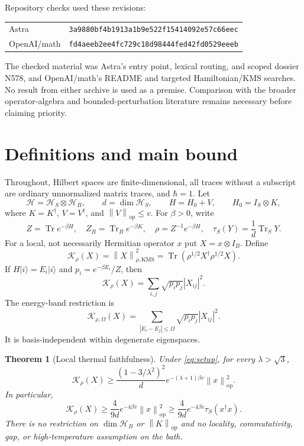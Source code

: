 \documentclass[11pt]{article}
\newtheorem{theorem}{Theorem}[section]
\theoremstyle{remark}\newtheorem{remark}[theorem]{Remark}
\newcommand{\Tr}{\operatorname{Tr}}
\newcommand{\op}{\mathrm{op}}
\newcommand{\KMS}{\mathrm{KMS}}
\newcommand{\norm}[1]{\left\lVert #1\right\rVert}
\newcommand{\abs}[1]{\left\lvert #1\right\rvert}
\newcommand{\tauS}{\tau_S}
\begin{document}
Repository checks used these revisions:\par
{\small\begin{tabular}{@{}ll@{}}
Astra & \texttt{3a9880bf4b1913a1b9e522f15414092e57c66eec}\\
OpenAI/math & \texttt{fd4aeeb2ee4fc729c18d98444fed42fd0529eeeb}
\end{tabular}}\par
The checked material was Astra's entry point, lexical routing, and scoped dossier N578, and OpenAI/math's README and targeted Hamiltonian/KMS searches. No result from either archive is used as a premise. Comparison with the broader operator-algebra and bounded-perturbation literature remains necessary before claiming priority.

\section{Definitions and main bound}
Throughout, Hilbert spaces are finite-dimensional, all traces without a subscript are ordinary unnormalized matrix traces, and $\hbar=1$. Let
\begin{equation}\label{eq:setup}
 \mathcal H=\mathcal H_S\otimes\mathcal H_B,\qquad
 d=\dim\mathcal H_S,\qquad H=H_0+V,\qquad H_0=I_S\otimes K,
\end{equation}
where $K=K^\dagger$, $V=V^\dagger$, and $\norm V_\op\leq v$. For $\beta>0$, write
\[
 Z=\Tr e^{-\beta H},\quad Z_B=\Tr_B e^{-\beta K},\quad
 \rho=Z^{-1}e^{-\beta H},\quad \tauS(Y)=\frac{1}{d}\Tr_S Y.
\]
For a local, not necessarily Hermitian operator $x$ put $X=x\otimes I_B$. Define
\begin{equation}
 \mathcal K_\rho(X)=\norm X_{\rho,\KMS}^2
 =\Tr(\rho^{1/2}X^\dagger\rho^{1/2}X).
\end{equation}
If $H|i\rangle=E_i|i\rangle$ and $p_i=e^{-\beta E_i}/Z$, then
\begin{equation}\label{eq:kms-spectral}
 \mathcal K_\rho(X)=\sum_{i,j}\sqrt{p_i p_j}\abs{X_{ij}}^2.
\end{equation}
The energy-band restriction is
\begin{equation}
 \mathcal K_{\rho,\Omega}(X)=
 \sum_{\abs{E_i-E_j}\leq\Omega}\sqrt{p_i p_j}\abs{X_{ij}}^2.
\end{equation}
It is basis-independent within degenerate eigenspaces.

\begin{theorem}[Local thermal faithfulness]\label{thm:main}
Under \eqref{eq:setup}, for every $\lambda>\sqrt3$,
\begin{equation}\label{eq:main-lambda}
 \mathcal K_\rho(X)\geq
 \frac{(1-3/\lambda^2)^2}{d}
 e^{-(\lambda+1)\beta v}\norm x_\op^2.
\end{equation}
In particular,
\begin{equation}\label{eq:main}
 \boxed{\mathcal K_\rho(X)\geq
 \frac{4}{9d}e^{-4\beta v}\norm x_\op^2
 \geq\frac{4}{9d}e^{-4\beta v}\tauS(x^\dagger x).}
\end{equation}
There is no restriction on $\dim\mathcal H_B$ or $\norm K_\op$ and no locality, commutativity, gap, or high-temperature assumption on the bath.
\end{theorem}
\end{document}
